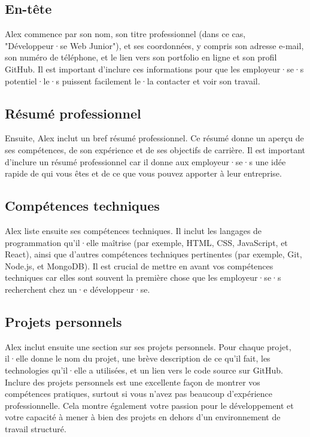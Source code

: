 \subsection{En-tête}

Alex commence par son nom, son titre professionnel (dans ce cas, "Développeur·se Web Junior"), et ses coordonnées, y compris son adresse e-mail, son numéro de téléphone, et le lien vers son portfolio en ligne et son profil GitHub. Il est important d'inclure ces informations pour que les employeur·se·s potentiel·le·s puissent facilement le·la contacter et voir son travail.

\subsection{Résumé professionnel}

Ensuite, Alex inclut un bref résumé professionnel. Ce résumé donne un aperçu de ses compétences, de son expérience et de ses objectifs de carrière. Il est important d'inclure un résumé professionnel car il donne aux employeur·se·s une idée rapide de qui vous êtes et de ce que vous pouvez apporter à leur entreprise.

\subsection{Compétences techniques}

Alex liste ensuite ses compétences techniques. Il inclut les langages de programmation qu'il·elle maîtrise (par exemple, HTML, CSS, JavaScript, et React), ainsi que d'autres compétences techniques pertinentes (par exemple, Git, Node.js, et MongoDB). Il est crucial de mettre en avant vos compétences techniques car elles sont souvent la première chose que les employeur·se·s recherchent chez un·e développeur·se.

\subsection{Projets personnels}

Alex inclut ensuite une section sur ses projets personnels. Pour chaque projet, il·elle donne le nom du projet, une brève description de ce qu'il fait, les technologies qu'il·elle a utilisées, et un lien vers le code source sur GitHub. Inclure des projets personnels est une excellente façon de montrer vos compétences pratiques, surtout si vous n'avez pas beaucoup d'expérience professionnelle. Cela montre également votre passion pour le développement et votre capacité à mener à bien des projets en dehors d'un environnement de travail structuré.


